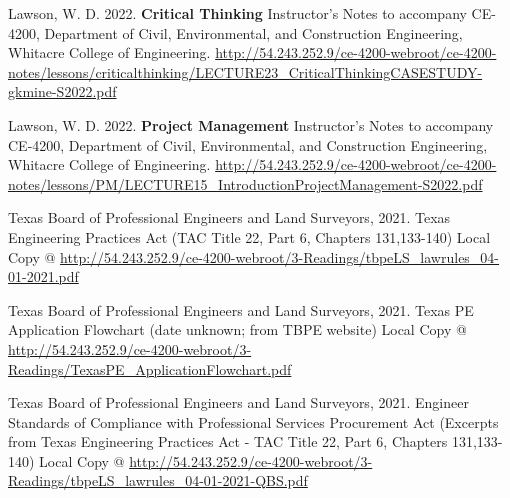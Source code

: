 \documentclass[12pt]{article}
\begin{document}
\begin{thebibliography}{}
Lawson, W. D. 2022. \textbf{Critical Thinking} Instructor's Notes to accompany CE-4200, Department of Civil, Environmental, and Construction Engineering, Whitacre College of Engineering. \url{http://54.243.252.9/ce-4200-webroot/ce-4200-notes/lessons/criticalthinking/LECTURE23_CriticalThinkingCASESTUDY-gkmine-S2022.pdf}

Lawson, W. D. 2022. \textbf{Project Management} Instructor's Notes to accompany CE-4200, Department of Civil, Environmental, and Construction Engineering, Whitacre College of Engineering. \url{http://54.243.252.9/ce-4200-webroot/ce-4200-notes/lessons/PM/LECTURE15_IntroductionProjectManagement-S2022.pdf}

Texas Board of Professional Engineers and Land Surveyors, 2021.  
Texas Engineering Practices Act (TAC Title 22, Part 6, Chapters 131,133-140)
Local Copy @ \url{http://54.243.252.9/ce-4200-webroot/3-Readings/tbpeLS_lawrules_04-01-2021.pdf}

Texas Board of Professional Engineers and Land Surveyors, 2021. 
Texas PE Application Flowchart (date unknown; from TBPE website)
Local Copy @ \url{http://54.243.252.9/ce-4200-webroot/3-Readings/TexasPE_ApplicationFlowchart.pdf} 

Texas Board of Professional Engineers and Land Surveyors, 2021.  
Engineer Standards of Compliance with Professional Services Procurement Act (Excerpts from Texas Engineering Practices Act - TAC Title 22, Part 6, Chapters 131,133-140)
Local Copy @ \url{http://54.243.252.9/ce-4200-webroot/3-Readings/tbpeLS_lawrules_04-01-2021-QBS.pdf}

\end{thebibliography}
\end{document}
